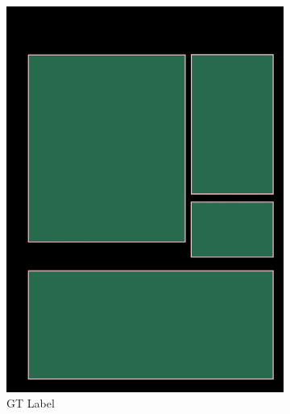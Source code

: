 \documentclass[aspectratio=1610]{beamer}
\begin{document}
\begin{frame}
\begin{figure}
\begin{subfigure}{.25\textwidth}
  \includegraphics[width=0.99\linewidth, clip=true, trim = 0mm 0mm 0mm 0mm]{figures/bbox/y3LXnnL.jpg}
  \caption{GT Label}
\end{subfigure}%
\begin{subfigure}{.25\textwidth}
  \centering

\end{subfigure}
\end{figure}
\end{frame}
\end{document}
